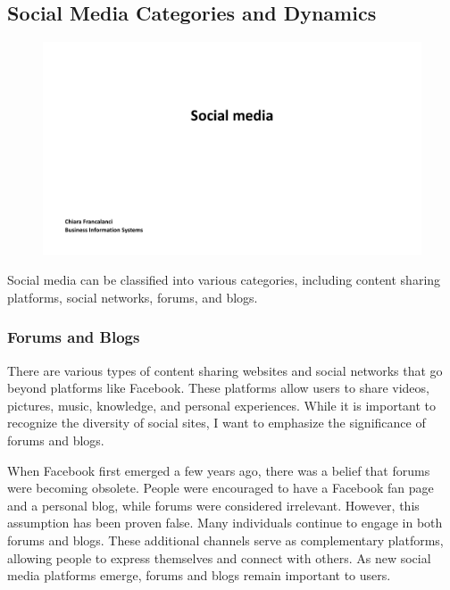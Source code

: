 \subsection{Social Media Categories and
    Dynamics}\label{social-media-categories-and-dynamics}

\begin{figure}[!h]
    \centering
    \includegraphics[page=5, trim = 1.5cm 5cm 3cm 4cm, clip, width=\textwidth]{images/04 - Social_Media.pdf}
\end{figure}

Social media can be classified into various categories, including
content sharing platforms, social networks, forums, and blogs.

\subsubsection{Forums and Blogs}\label{forums-and-blogs}

There are various types of content sharing websites and social networks
that go beyond platforms like Facebook. These platforms allow users to
share videos, pictures, music, knowledge, and personal experiences.
While it is important to recognize the diversity of social sites, I want
to emphasize the significance of forums and blogs.

When Facebook first emerged a few years ago, there was a belief that
forums were becoming obsolete. People were encouraged to have a Facebook
fan page and a personal blog, while forums were considered irrelevant.
However, this assumption has been proven false. Many individuals
continue to engage in both forums and blogs. These additional channels
serve as complementary platforms, allowing people to express themselves
and connect with others. As new social media platforms emerge, forums
and blogs remain important to users.

